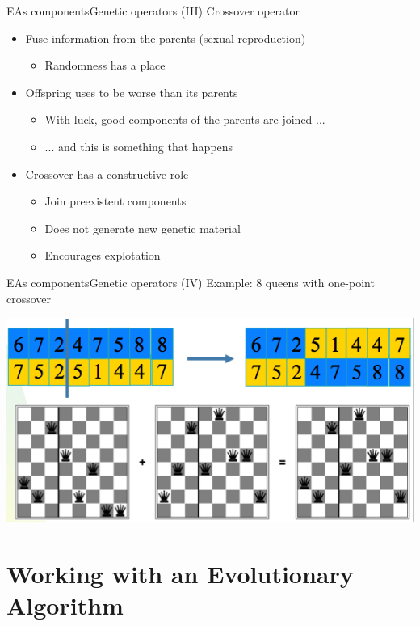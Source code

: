 \documentclass[10pt,compress]{beamer} %
\begin{document}
\begin{frame}{EAs components}{Genetic operators (III)} 
	Crossover operator
	\begin{itemize}
		\item Fuse information from the parents (sexual reproduction)
		\begin{itemize}
			\item Randomness has a place 
		\end{itemize}
		\item Offspring uses to be worse than its parents
		\begin{itemize}
			\item With luck, good components of the parents are joined ...
			\item ... and this is something that happens
		\end{itemize}
		\item Crossover has a constructive role
		\begin{itemize}
			\item Join preexistent components
			\item Does not generate new genetic material
			\item Encourages explotation
		\end{itemize}
	\end{itemize}
\end{frame}

\begin{frame}{EAs components}{Genetic operators (IV)} 
	Example: 8 queens with one-point crossover
	\begin{center}
		\includegraphics[width=0.7\linewidth]{figs/one-point.png}
	\end{center}
\end{frame}

\section{Working with an Evolutionary Algorithm}
\end{document}
